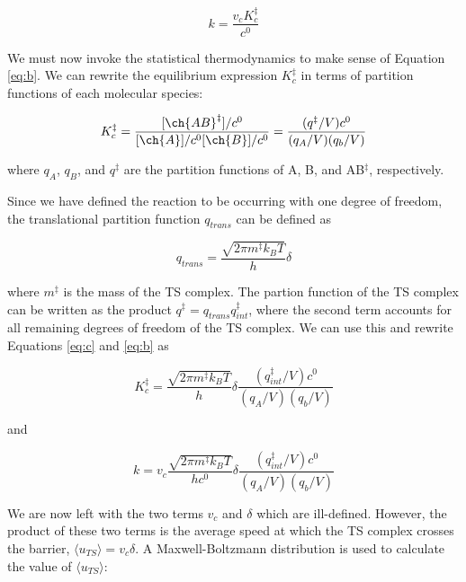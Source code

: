 \begin{equation}
  k = \frac{v_cK_c^\ddagger}{c^0}
\label{eq:b}
\end{equation}

We must now invoke the statistical thermodynamics to make sense of Equation \ref{eq:b}. We can rewrite the equilibrium expression $K_c^\ddagger$ in terms of partition functions of each molecular species:

\begin{equation}
    K_c^{\ddagger} = \frac{[\ch{AB}^\ddagger]/c^0}{[\ch{A}]/c^0[\ch{B}]/c^0}
    = \frac{(q^\ddagger/V)c^0}{(q_A/V)(q_b/V)}
\label{eq:c}
\end{equation}

\noindent where $q_A$, $q_B$, and $q^\ddagger$ are the partition functions of A, B, and AB$^\ddagger$, respectively.

Since we have defined the reaction to be occurring with one degree of freedom, the translational partition function $q_{trans}$ can be defined as

\begin{equation}
  q_{trans} = \frac{\sqrt{2\pi m^\ddagger k_BT}}{h}\delta
\end{equation}

\noindent where $m^\ddagger$ is the mass of the TS complex. The partion function of the TS complex can be written as the product $q^\ddagger = q_{trans}q_{int}^\ddagger$, where the second term accounts for all remaining degrees of freedom of the TS complex. We can use this and rewrite Equations \ref{eq:c} and \ref{eq:b} as

\begin{equation}
  K_c^{\ddagger} =  \frac{\sqrt{2\pi m^\ddagger k_BT}}{h}\delta\frac{(q_{int}^\ddagger/V)c^0}{(q_A/V)(q_b/V)}
\end{equation}

\noindent and

\begin{equation}
 k = v_c \frac{\sqrt{2\pi m^\ddagger
     k_BT}}{hc^0}\delta\frac{(q_{int}^\ddagger/V)c^0}{(q_A/V)(q_b/V)}
\label{eq:d}
\end{equation}

We are now left with the two terms $v_c$ and $\delta$ which are ill-defined. However, the product of these two terms is the average speed at which the TS complex crosses the barrier, $\langle u_{TS} \rangle = v_c\delta$. A Maxwell-Boltzmann distribution is used to calculate the value of $\langle u_{TS} \rangle$:

